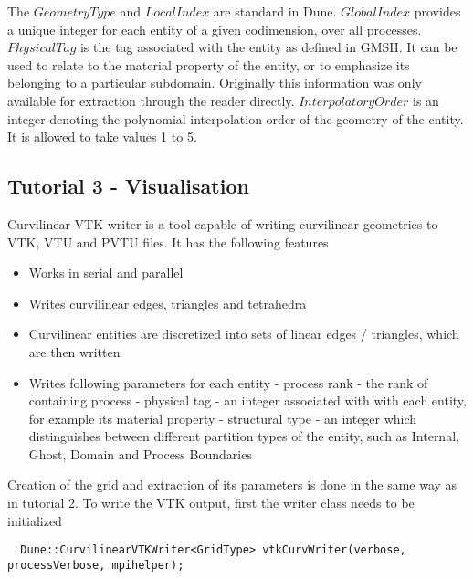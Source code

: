 The $GeometryType$ and $LocalIndex$ are standard in Dune. $GlobalIndex$ provides a unique integer for each entity of a given codimension, over all processes. $PhysicalTag$ is the tag associated with the entity as defined in GMSH. It can be used to relate to the material property of the entity, or to emphasize its belonging to a particular subdomain. Originally this information was only available for extraction through the reader directly. $InterpolatoryOrder$ is an integer denoting the polynomial interpolation order of the geometry of the entity. It is allowed to take values 1 to 5. \\






\subsection{Tutorial 3 - Visualisation}
\label{usage-howto-tutorial-visualisation}

Curvilinear VTK writer is a tool capable of writing curvilinear geometries to VTK, VTU and PVTU files. It has the following features
\begin{itemize}
	\item Works in serial and parallel
	\item Writes curvilinear edges, triangles and tetrahedra
	\item Curvilinear entities are discretized into sets of linear edges / triangles, which are then written
	\item Writes following parameters for each entity
	  \subitem - process rank    - the rank of containing process
	  \subitem - physical tag    - an integer associated with with each entity, for example its material property
	  \subitem - structural type - an integer which distinguishes between different partition types of the entity, such as Internal, Ghost, Domain and Process Boundaries
\end{itemize}

\noindent
Creation of the grid and extraction of its parameters is done in the same way as in tutorial 2. To write the VTK output, first the writer class needs to be initialized \\

\begin{mybox}
\begin{lstlisting}
  Dune::CurvilinearVTKWriter<GridType> vtkCurvWriter(verbose, processVerbose, mpihelper);
\end{lstlisting}
\end{mybox}

